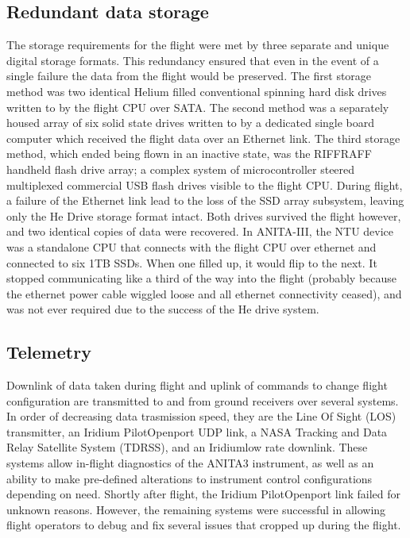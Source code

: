 	\subsection{Redundant data storage}
		The storage requirements for the flight were met by three separate and unique digital storage formats.  This redundancy ensured that even in the event of a single failure the data from the flight would be preserved.  The first storage method was two identical Helium filled conventional spinning hard disk drives written to by the flight CPU over SATA.  The second method was a separately housed array of six solid state drives written to by a dedicated single board computer which received the flight data over an Ethernet link.  The third storage method, which ended being flown in an inactive state, was the RIFFRAFF handheld flash drive array; a complex system of microcontroller steered multiplexed commercial USB flash drives visible to the flight CPU.  During flight, a failure of the Ethernet link lead to the loss of the SSD array subsystem, leaving only the He Drive storage format intact.  Both drives survived the flight however, and two identical copies of data were recovered.
		In ANITA-III, the NTU device was a standalone CPU that connects with the flight CPU over ethernet and connected to six 1TB SSDs.  When one filled up, it would flip to the next.  It stopped communicating like a third of the way into the flight (probably because the ethernet power cable wiggled loose and all ethernet connectivity ceased), and was not ever required due to the success of the He drive system.
		
	
	\subsection{Telemetry}
		Downlink of data taken during flight and uplink of commands to change flight configuration are transmitted to and from ground receivers over several systems.  In order of decreasing data trasmission speed, they are the Line Of Sight (LOS) transmitter, an Iridium Pilot\textregistered Openport UDP link, a NASA Tracking and Data Relay Satellite System (TDRSS), and an Iridium\textregistered low rate downlink.  These systems allow in-flight diagnostics of the ANITA3 instrument, as well as an ability to make pre-defined alterations to instrument control configurations depending on need.  Shortly after flight, the Iridium Pilot\textregistered Openport link failed for unknown reasons.  However, the remaining systems were successful in allowing flight operators to debug and fix several issues that cropped up during the flight.
		
